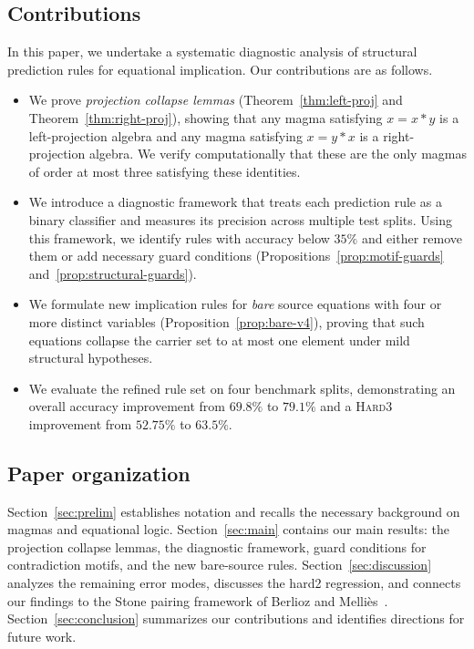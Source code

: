 \subsection{Contributions}
In this paper, we undertake a systematic diagnostic analysis of
structural prediction rules for equational implication.  Our
contributions are as follows.
\begin{itemize}[leftmargin=*,itemsep=2pt,topsep=2pt]
\item We prove \emph{projection collapse lemmas}
  (Theorem~\ref{thm:left-proj} and Theorem~\ref{thm:right-proj}),
  showing that any magma satisfying $x = x*y$ is a left-projection
  algebra and any magma satisfying $x = y*x$ is a right-projection
  algebra.  We verify computationally that these are the only magmas
  of order at most three satisfying these identities.

\item We introduce a diagnostic framework that treats each prediction
  rule as a binary classifier and measures its precision across
  multiple test splits.  Using this framework, we identify rules with
  accuracy below $35\%$ and either remove them or add necessary
  guard conditions (Propositions~\ref{prop:motif-guards}
  and~\ref{prop:structural-guards}).

\item We formulate new implication rules for \emph{bare} source
  equations with four or more distinct variables
  (Proposition~\ref{prop:bare-v4}), proving that such equations
  collapse the carrier set to at most one element under mild
  structural hypotheses.

\item We evaluate the refined rule set on four benchmark splits,
  demonstrating an overall accuracy improvement from $69.8\%$ to
  $79.1\%$ and a \textsc{Hard3} improvement from $52.75\%$ to $63.5\%$.
\end{itemize}

\subsection{Paper organization}
Section~\ref{sec:prelim} establishes notation and recalls the necessary
background on magmas and equational logic.  Section~\ref{sec:main}
contains our main results: the projection collapse lemmas, the
diagnostic framework, guard conditions for contradiction motifs,
and the new bare-source rules.  Section~\ref{sec:discussion} analyzes
the remaining error modes, discusses the hard2 regression, and connects
our findings to the Stone pairing framework of
Berlioz and Melli\`es~\cite{berlioz2026latent}.
Section~\ref{sec:conclusion} summarizes our contributions and
identifies directions for future work.
